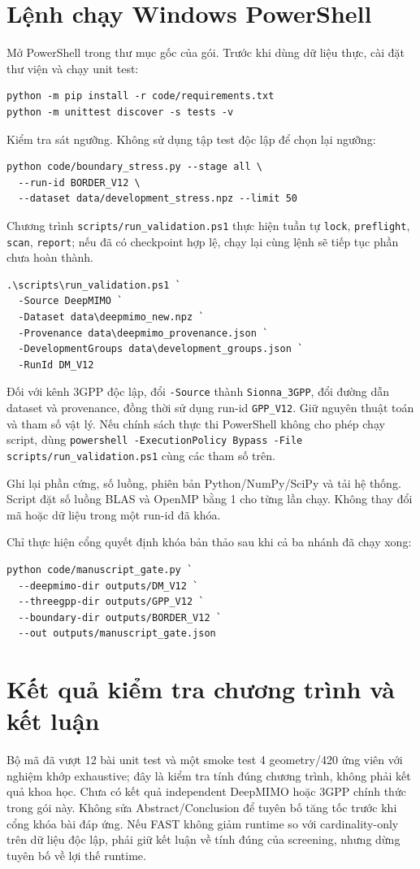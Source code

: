 \documentclass[11pt,onecolumn]{IEEEtran}
\begin{document}
\section{Lệnh chạy Windows PowerShell}
Mở PowerShell trong thư mục gốc của gói. Trước khi dùng dữ liệu thực, cài đặt thư viện và chạy unit test:
\begin{verbatim}
python -m pip install -r code/requirements.txt
python -m unittest discover -s tests -v
\end{verbatim}
Kiểm tra sát ngưỡng. Không sử dụng tập test độc lập để chọn lại ngưỡng:
\begin{verbatim}
python code/boundary_stress.py --stage all \
  --run-id BORDER_V12 \
  --dataset data/development_stress.npz --limit 50
\end{verbatim}
Chương trình \texttt{scripts/run\_validation.ps1} thực hiện tuần tự \texttt{lock}, \texttt{preflight}, \texttt{scan}, \texttt{report}; nếu đã có checkpoint hợp lệ, chạy lại cùng lệnh sẽ tiếp tục phần chưa hoàn thành.
\begin{verbatim}
.\scripts\run_validation.ps1 `
  -Source DeepMIMO `
  -Dataset data\deepmimo_new.npz `
  -Provenance data\deepmimo_provenance.json `
  -DevelopmentGroups data\development_groups.json `
  -RunId DM_V12
\end{verbatim}
Đối với kênh 3GPP độc lập, đổi \texttt{-Source} thành \texttt{Sionna\_3GPP}, đổi đường dẫn dataset và provenance, đồng thời sử dụng run-id \texttt{GPP\_V12}. Giữ nguyên thuật toán và tham số vật lý. Nếu chính sách thực thi PowerShell không cho phép chạy script, dùng \texttt{powershell -ExecutionPolicy Bypass -File scripts/run\_validation.ps1} cùng các tham số trên.

Ghi lại phần cứng, số luồng, phiên bản Python/NumPy/SciPy và tải hệ thống. Script đặt số luồng BLAS và OpenMP bằng 1 cho từng lần chạy. Không thay đổi mã hoặc dữ liệu trong một run-id đã khóa.

Chỉ thực hiện cổng quyết định khóa bản thảo sau khi cả ba nhánh đã chạy xong:
\begin{verbatim}
python code/manuscript_gate.py `
  --deepmimo-dir outputs/DM_V12 `
  --threegpp-dir outputs/GPP_V12 `
  --boundary-dir outputs/BORDER_V12 `
  --out outputs/manuscript_gate.json
\end{verbatim}
\section{Kết quả kiểm tra chương trình và kết luận}
Bộ mã đã vượt 12 bài unit test và một smoke test 4 geometry/420 ứng viên với nghiệm khớp exhaustive; đây là kiểm tra tính đúng chương trình, không phải kết quả khoa học. Chưa có kết quả independent DeepMIMO hoặc 3GPP chính thức trong gói này. Không sửa Abstract/Conclusion để tuyên bố tăng tốc trước khi cổng khóa bài đáp ứng. Nếu FAST không giảm runtime so với cardinality-only trên dữ liệu độc lập, phải giữ kết luận về tính đúng của screening, nhưng dừng tuyên bố về lợi thế runtime.
\end{document}
